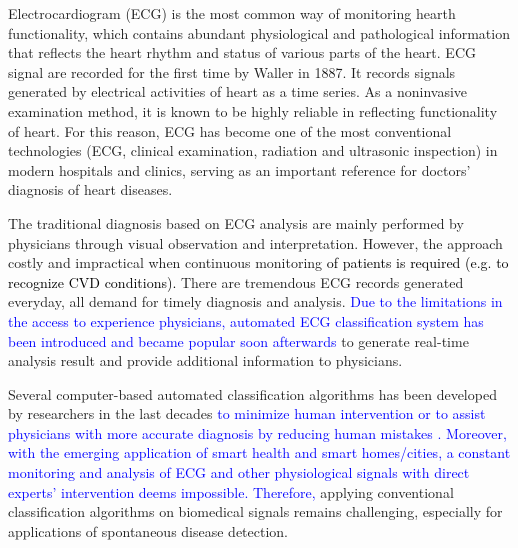 Electrocardiogram (ECG) is the most common way of monitoring hearth functionality, which %
contains abundant physiological and pathological information that reflects the heart rhythm and status of various parts of the heart. ECG signal are recorded for the first time by Waller in 1887\cite{besterman1979waller}. %
It records signals generated by electrical activities of heart as a time series. As a noninvasive examination method, it is known to be highly reliable in reflecting functionality of heart. For this reason, ECG has become one of the most conventional technologies (ECG, clinical examination, radiation and ultrasonic inspection) in modern hospitals and clinics, serving as an important reference for doctors' diagnosis of heart diseases\cite{kreger1987electrocardiogram}.


The traditional diagnosis based on ECG analysis are mainly performed by physicians through visual observation and interpretation.%
However, the approach costly and impractical when continuous monitoring \textcolor{black}{of patients is required (e.g. to recognize CVD conditions).}%
There are tremendous ECG records generated everyday, all demand for timely diagnosis and analysis. %
\textcolor{blue}{Due to the limitations in the access to experience physicians, automated  ECG classification system has been introduced and became popular soon afterwards} to generate real-time analysis result and provide additional information to physicians. 

Several computer-based automated classification algorithms has been developed by researchers in the last decades \textcolor{blue}{to minimize human intervention or to assist physicians with more accurate diagnosis by reducing human mistakes \cite{lagerholm2000clustering, prasad2003classification, autofs, ceylan2009novel, osowski2004support, Hu_et_al,deChazal2006,llamedo2012automatic,bbnn,ince2009generic,Kiranyaz}.} \textcolor{blue}{Moreover, with the emerging application of smart health and smart homes/cities, a constant monitoring and analysis of ECG and other physiological signals with direct experts' intervention deems impossible. Therefore,} applying conventional classification algorithms on biomedical signals remains challenging, especially for applications of spontaneous disease detection. 


